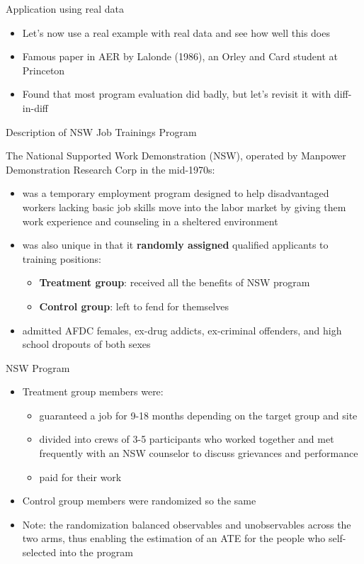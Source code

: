 \documentclass{beamer}
\begin{document}
\begin{frame}{Application using real data}

\begin{itemize}
\item Let's now use a real example with real data and see how well this does
\item Famous paper in AER by Lalonde (1986), an Orley and Card student at Princeton
\item Found that most program evaluation did badly, but let's revisit it with diff-in-diff
\end{itemize}

\end{frame}

\begin{frame}{Description of NSW Job Trainings Program}
	
The National Supported Work Demonstration (NSW), operated by Manpower Demonstration Research Corp in the mid-1970s:
	\begin{itemize}
	\item was a temporary employment program designed to help disadvantaged workers lacking basic job skills move into the labor market by giving them work experience and counseling in a sheltered environment
	\item was also unique in that it \textbf{randomly assigned} qualified applicants to training positions:
		\begin{itemize}
		\item \textbf{Treatment group}: received all the benefits of NSW program
		\item \textbf{Control group}: left to fend for themselves
		\end{itemize}
	\item admitted AFDC females, ex-drug addicts, ex-criminal offenders, and high school dropouts of both sexes
	\end{itemize}
\end{frame}

\begin{frame}{NSW Program}
	
	\begin{itemize}
	\item Treatment group members were:
		\begin{itemize}
		\item guaranteed a job for 9-18 months depending on the target group and site
		\item divided into crews of 3-5 participants who worked together and met frequently with an NSW counselor to discuss grievances and performance
		\item paid for their work
		\end{itemize}
	\item Control group members were randomized so the same
	\item Note: the randomization balanced observables and unobservables across the two arms, thus enabling the estimation of an ATE for the people who self-selected into the program
	\end{itemize}
\end{frame}
\end{document}
